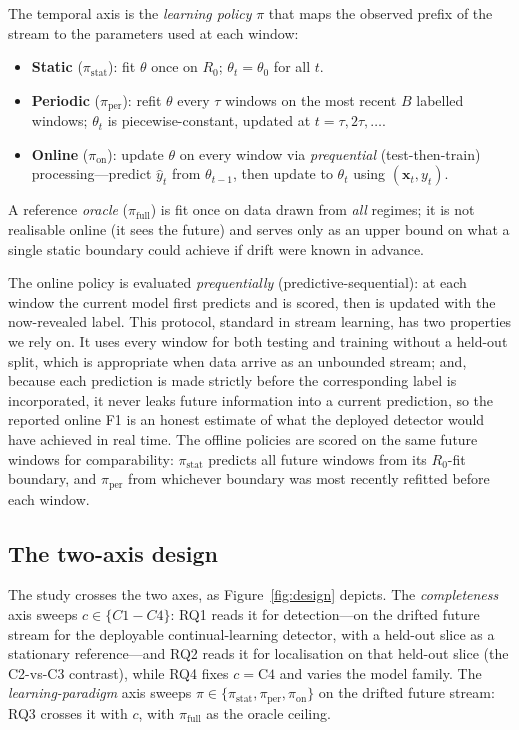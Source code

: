 \documentclass[pdflatex,sn-mathphys-num]{sn-jnl}%
\theoremstyle{thmstyleone}%
\theoremstyle{thmstyletwo}%
\theoremstyle{thmstylethree}%
\begin{document}
The temporal axis is the \emph{learning policy} $\pi$ that maps the observed prefix of the stream to the parameters used at each window:
\begin{itemize}
  \item \textbf{Static} ($\pi_{\text{stat}}$): fit $\theta$ once on $R_0$; $\theta_t = \theta_0$ for all $t$.
  \item \textbf{Periodic} ($\pi_{\text{per}}$): refit $\theta$ every $\tau$ windows on the most recent $B$ labelled windows; $\theta_t$ is piecewise-constant, updated at $t = \tau, 2\tau, \dots$.
  \item \textbf{Online} ($\pi_{\text{on}}$): update $\theta$ on every window via \emph{prequential} (test-then-train) processing---predict $\hat{y}_t$ from $\theta_{t-1}$, then update to $\theta_t$ using $(\mathbf{x}_t, y_t)$.
\end{itemize}
A reference \emph{oracle} ($\pi_{\text{full}}$) is fit once on data drawn from \emph{all} regimes; it is not realisable online (it sees the future) and serves only as an upper bound on what a single static boundary could achieve if drift were known in advance.

The online policy is evaluated \emph{prequentially} (predictive-sequential): at each window the current model first predicts and is scored, then is updated with the now-revealed label. This protocol, standard in stream learning, has two properties we rely on. It uses every window for both testing and training without a held-out split, which is appropriate when data arrive as an unbounded stream; and, because each prediction is made strictly before the corresponding label is incorporated, it never leaks future information into a current prediction, so the reported online F1 is an honest estimate of what the deployed detector would have achieved in real time. The offline policies are scored on the same future windows for comparability: $\pi_{\text{stat}}$ predicts all future windows from its $R_0$-fit boundary, and $\pi_{\text{per}}$ from whichever boundary was most recently refitted before each window.

\subsection{The two-axis design}\label{sec:prob-design}

The study crosses the two axes, as Figure~\ref{fig:design} depicts. The \emph{completeness} axis sweeps $c \in \{C1{-}C4\}$: RQ1 reads it for detection---on the drifted future stream for the deployable continual-learning detector, with a held-out slice as a stationary reference---and RQ2 reads it for localisation on that held-out slice (the C2-vs-C3 contrast), while RQ4 fixes $c=\text{C4}$ and varies the model family. The \emph{learning-paradigm} axis sweeps $\pi \in \{\pi_{\text{stat}}, \pi_{\text{per}}, \pi_{\text{on}}\}$ on the drifted future stream: RQ3 crosses it with $c$, with $\pi_{\text{full}}$ as the oracle ceiling.
\end{document}

